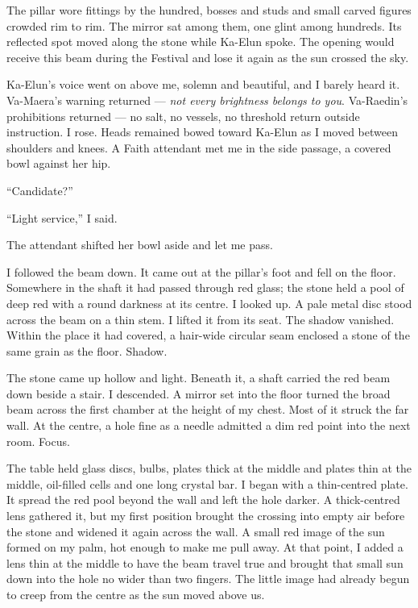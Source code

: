 The pillar wore fittings by the hundred, bosses and studs and small carved figures crowded rim to rim. The mirror sat among them, one glint among hundreds. Its reflected spot moved along the stone while Ka-Elun spoke. The opening would receive this beam during the Festival and lose it again as the sun crossed the sky.\par

\ornament

Ka-Elun's voice went on above me, solemn and beautiful, and I barely heard it. Va-Maera's warning returned --- \textit{not every brightness belongs to you}. Va-Raedin's prohibitions returned --- no salt, no vessels, no threshold return outside instruction. I rose. Heads remained bowed toward Ka-Elun as I moved between shoulders and knees. A Faith attendant met me in the side passage, a covered bowl against her hip.\par

``Candidate?''\par
``Light service,'' I said.\par

The attendant shifted her bowl aside and let me pass.\par

I followed the beam down. It came out at the pillar's foot and fell on the floor. Somewhere in the shaft it had passed through red glass; the stone held a pool of deep red with a round darkness at its centre. I looked up. A pale metal disc stood across the beam on a thin stem. I lifted it from its seat. The shadow vanished. Within the place it had covered, a hair-wide circular seam enclosed a stone of the same grain as the floor. Shadow.\par

The stone came up hollow and light. Beneath it, a shaft carried the red beam down beside a stair. I descended. A mirror set into the floor turned the broad beam across the first chamber at the height of my chest. Most of it struck the far wall. At the centre, a hole fine as a needle admitted a dim red point into the next room. Focus.\par

The table held glass discs, bulbs, plates thick at the middle and plates thin at the middle, oil-filled cells and one long crystal bar. I began with a thin-centred plate. It spread the red pool beyond the wall and left the hole darker. A thick-centred lens gathered it, but my first position brought the crossing into empty air before the stone and widened it again across the wall. A small red image of the sun formed on my palm, hot enough to make me pull away. At that point, I added a lens thin at the middle to have the beam travel true and brought that small sun down into the hole no wider than two fingers. The little image had already begun to creep from the centre as the sun moved above us. \par

